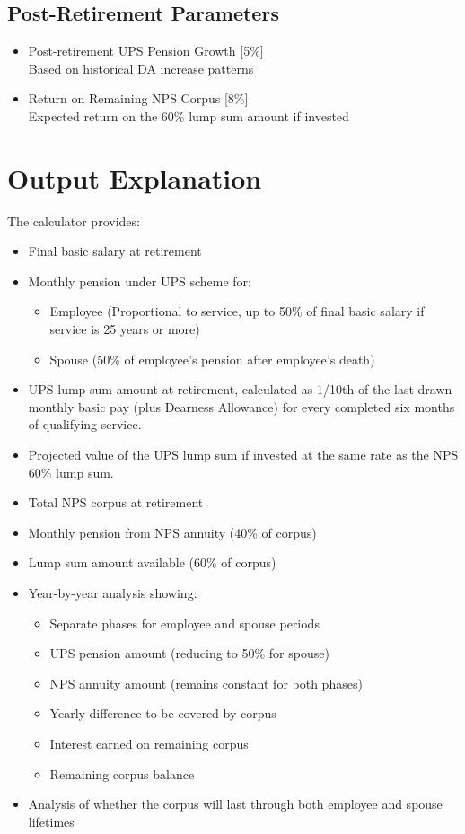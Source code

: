 \documentclass{article}
\begin{document}
\subsection{Post-Retirement Parameters}
\begin{itemize}
    \item Post-retirement UPS Pension Growth [5\%] \\
          Based on historical DA increase patterns
    \item Return on Remaining NPS Corpus [8\%] \\
          Expected return on the 60\% lump sum amount if invested
\end{itemize}

\section{Output Explanation}
The calculator provides:
\begin{itemize}
    \item Final basic salary at retirement
    \item Monthly pension under UPS scheme for:
    \begin{itemize}
        \item Employee (Proportional to service, up to 50\% of final basic salary if service is 25 years or more)
        \item Spouse (50\% of employee's pension after employee's death)
    \end{itemize}
    \item UPS lump sum amount at retirement, calculated as 1/10th of the last drawn monthly basic pay (plus Dearness Allowance) for every completed six months of qualifying service.
    \item Projected value of the UPS lump sum if invested at the same rate as the NPS 60\% lump sum.
    \item Total NPS corpus at retirement
    \item Monthly pension from NPS annuity (40\% of corpus)
    \item Lump sum amount available (60\% of corpus)
    \item Year-by-year analysis showing:
    \begin{itemize}
        \item Separate phases for employee and spouse periods
        \item UPS pension amount (reducing to 50\% for spouse)
        \item NPS annuity amount (remains constant for both phases)
        \item Yearly difference to be covered by corpus
        \item Interest earned on remaining corpus
        \item Remaining corpus balance
    \end{itemize}
    \item Analysis of whether the corpus will last through both employee and spouse lifetimes
\end{itemize}
\end{document}
